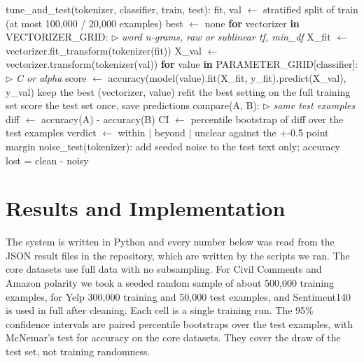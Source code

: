 \documentclass[journal,a4paper]{IEEEtran}
\begin{document}
\begin{algorithm}[!tb]
\scriptsize
\caption{Tuning, paired comparison and noise test}\label{alg:6}
\begin{algorithmic}[1]
\State tune\_and\_test(tokenizer, classifier, train, test):
\State \hspace*{1.0em}fit, val $\leftarrow$ stratified split of train (at most 100,000 / 20,000 examples)
\State \hspace*{1.0em}best $\leftarrow$ none
\State \hspace*{1.0em}\textbf{for} vectorizer \textbf{in} VECTORIZER\_GRID: \hfill{\scriptsize$\triangleright$ \textit{word n-grams, raw or sublinear tf, min\_df}}
\State \hspace*{2.0em}X\_fit $\leftarrow$ vectorizer.fit\_transform(tokenizer(fit))
\State \hspace*{2.0em}X\_val $\leftarrow$ vectorizer.transform(tokenizer(val))
\State \hspace*{2.0em}\textbf{for} value \textbf{in} PARAMETER\_GRID[classifier]: \hfill{\scriptsize$\triangleright$ \textit{C or alpha}}
\State \hspace*{3.0em}score $\leftarrow$ accuracy(model(value).fit(X\_fit, y\_fit).predict(X\_val), y\_val)
\State \hspace*{3.0em}keep the best (vectorizer, value)
\State \hspace*{1.0em}refit the best setting on the full training set
\State \hspace*{1.0em}score the test set once, save predictions
\Statex {}
\State compare(A, B): \hfill{\scriptsize$\triangleright$ \textit{same test examples}}
\State \hspace*{1.0em}diff $\leftarrow$ accuracy(A) - accuracy(B)
\State \hspace*{1.0em}CI   $\leftarrow$ percentile bootstrap of diff over the test examples
\State \hspace*{1.0em}verdict $\leftarrow$ within | beyond | unclear   against the +-0.5 point margin
\State noise\_test(tokenizer): add seeded noise to the test text only; accuracy lost = clean - noisy
\end{algorithmic}
\end{algorithm}

\section{Results and Implementation}\label{sec:4}
The system is written in Python and every number below was read from the JSON result files in the repository, which are written by the scripts we ran. The core datasets use full data with no subsampling. For Civil Comments and Amazon polarity we took a seeded random sample of about 500,000 training examples, for Yelp 300,000 training and 50,000 test examples, and Sentiment140 is used in full after cleaning. Each cell is a single training run. The 95\% confidence intervals are paired percentile bootstraps over the test examples, with McNemar's test for accuracy on the core datasets. They cover the draw of the test set, not training randomness.
\end{document}
